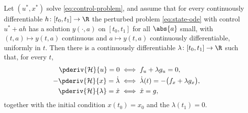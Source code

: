 \begin{theorem}
	\label{thm:maximum-principle}
	Let $(u^{\ast},x^{\ast})$ solve \eqref{eq:control-problem}, and assume that for
	every continuously differentiable $h\colon[t_0,t_1]\to\R$ the perturbed problem
	\eqref{eq:state-ode} with control $u^{\ast}+ah$ has a solution $y(\cdot,a)$ on
	$[t_0,t_1]$ for all $\abs{a}$ small, with $(t,a)\mapsto y(t,a)$ continuous and
	$a\mapsto y(t,a)$ continuously differentiable, uniformly in $t$. Then there is a
	continuously differentiable
	$\lambda\colon[t_0,t_1]\to\R$ such that, for every $t$,
	\begin{align}
		\pderiv{\mathcal{H}}{u}=0
		 & \iff f_u+\lambda g_u=0,\label{eq:mp-optimality}                     \\
		-\pderiv{\mathcal{H}}{x}=\dot\lambda
		 & \iff \dot\lambda(t)=-\bigl(f_x+\lambda g_x\bigr),\label{eq:mp-costate} \\
		\pderiv{\mathcal{H}}{\lambda}=\dot x
		 & \iff \dot x=g,\label{eq:mp-state}
	\end{align}
	together with the initial condition $x(t_0)=x_0$ and the
	 $\lambda(t_1)=0$.
\end{theorem}

